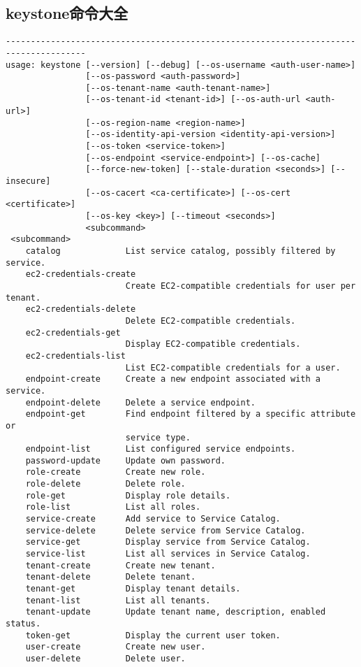 \documentclass[a4paper,left=1.5cm,right=1.5cm,11pt]{article}
\begin{document}
\subsection{keystone命令大全}
\begin{lstlisting}
--------------------------------------------------------------------------------------
usage: keystone [--version] [--debug] [--os-username <auth-user-name>]
                [--os-password <auth-password>]
                [--os-tenant-name <auth-tenant-name>]
                [--os-tenant-id <tenant-id>] [--os-auth-url <auth-url>]
                [--os-region-name <region-name>]
                [--os-identity-api-version <identity-api-version>]
                [--os-token <service-token>]
                [--os-endpoint <service-endpoint>] [--os-cache]
                [--force-new-token] [--stale-duration <seconds>] [--insecure]
                [--os-cacert <ca-certificate>] [--os-cert <certificate>]
                [--os-key <key>] [--timeout <seconds>]
                <subcommand> 
 <subcommand>
    catalog             List service catalog, possibly filtered by service.
    ec2-credentials-create
                        Create EC2-compatible credentials for user per tenant.
    ec2-credentials-delete
                        Delete EC2-compatible credentials.
    ec2-credentials-get
                        Display EC2-compatible credentials.
    ec2-credentials-list
                        List EC2-compatible credentials for a user.
    endpoint-create     Create a new endpoint associated with a service.
    endpoint-delete     Delete a service endpoint.
    endpoint-get        Find endpoint filtered by a specific attribute or
                        service type.
    endpoint-list       List configured service endpoints.
    password-update     Update own password.
    role-create         Create new role.
    role-delete         Delete role.
    role-get            Display role details.
    role-list           List all roles.
    service-create      Add service to Service Catalog.
    service-delete      Delete service from Service Catalog.
    service-get         Display service from Service Catalog.
    service-list        List all services in Service Catalog.
    tenant-create       Create new tenant.
    tenant-delete       Delete tenant.
    tenant-get          Display tenant details.
    tenant-list         List all tenants.
    tenant-update       Update tenant name, description, enabled status.
    token-get           Display the current user token.
    user-create         Create new user.
    user-delete         Delete user.

\end{lstlisting}
\end{document}
